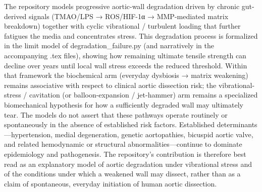 The repository models progressive aortic-wall degradation driven by chronic gut-derived signals (TMAO/LPS → ROS/HIF-1α → MMP-mediated matrix breakdown) together with cyclic vibrational / turbulent loading that further fatigues the media and concentrates stress. This degradation process is formalized in the limit model of degradation_failure.py (and narratively in the accompanying .tex files), showing how remaining ultimate tensile strength can decline over years until local wall stress exceeds the reduced threshold.
Within that framework the biochemical arm (everyday dysbiosis → matrix weakening) remains associative with respect to clinical aortic dissection risk; the vibrational-stress / cavitation (or balloon-expansion / jet-hammer) arm remains a specialized biomechanical hypothesis for how a sufficiently degraded wall may ultimately tear. The models do not assert that these pathways operate routinely or spontaneously in the absence of established risk factors.
Established determinants—hypertension, medial degeneration, genetic aortopathies, bicuspid aortic valve, and related hemodynamic or structural abnormalities—continue to dominate epidemiology and pathogenesis. The repository’s contribution is therefore best read as an explanatory model of aortic degradation under vibrational stress and of the conditions under which a weakened wall may dissect, rather than as a claim of spontaneous, everyday initiation of human aortic dissection.
